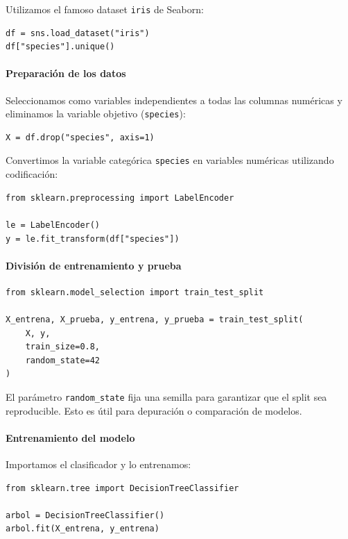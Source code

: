 \documentclass{article}
\theoremstyle{nonumberplain}
\begin{document}
Utilizamos el famoso dataset \texttt{iris} de Seaborn:

\begin{verbatim}
df = sns.load_dataset("iris")
df["species"].unique()
\end{verbatim}

\paragraph{Preparación de los datos}

Seleccionamos como variables independientes a todas las columnas numéricas y eliminamos la variable objetivo (\texttt{species}):

\begin{verbatim}
X = df.drop("species", axis=1)
\end{verbatim}

Convertimos la variable categórica \texttt{species} en variables numéricas utilizando codificación:

\begin{verbatim}
from sklearn.preprocessing import LabelEncoder

le = LabelEncoder()
y = le.fit_transform(df["species"])
\end{verbatim}

\paragraph{División de entrenamiento y prueba}

\begin{verbatim}
from sklearn.model_selection import train_test_split

X_entrena, X_prueba, y_entrena, y_prueba = train_test_split(
    X, y,
    train_size=0.8,
    random_state=42
)
\end{verbatim}

El parámetro \texttt{random\_state} fija una semilla para garantizar que el split sea reproducible. Esto es útil para depuración o comparación de modelos.

\paragraph{Entrenamiento del modelo}

Importamos el clasificador y lo entrenamos:

\begin{verbatim}
from sklearn.tree import DecisionTreeClassifier

arbol = DecisionTreeClassifier()
arbol.fit(X_entrena, y_entrena)
\end{verbatim}
\end{document}
